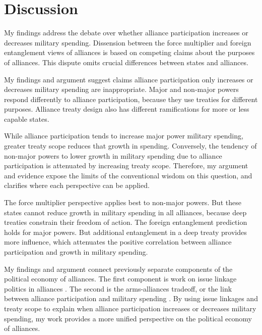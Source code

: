 \documentclass[12pt]{article}
\begin{document}
\section{Discussion}


My findings address the debate over whether alliance participation increases or decreases military spending. 
Dissension between the force multiplier and foreign entanglement views of alliances is based on competing claims about the purposes of alliances. 
This dispute omits crucial differences between states and alliances. 


My findings and argument suggest claims alliance participation only increases or decreases military spending are inappropriate. 
Major and non-major powers respond differently to alliance participation, because they use treaties for different purposes. 
Alliance treaty design also has different ramifications for more or less capable states. 


While alliance participation tends to increase major power military spending, greater treaty scope reduces that growth in spending. 
Conversely, the tendency of non-major powers to lower growth in military spending due to alliance participation is attenuated by increasing treaty scope. 
Therefore, my argument and evidence expose the limits of the conventional wisdom on this question, and clarifies where each perspective can be applied. 


The force multiplier perspective applies best to non-major powers. 
But these states cannot reduce growth in military spending in all alliances, because deep treaties constrain their freedom of action.
The foreign entanglement prediction holds for major powers. 
But additional entanglement in a deep treaty provides more influence, which attenuates the positive correlation between alliance participation and growth in military spending. 


My findings and argument connect previously separate components of the political economy of alliances. 
The first component is work on issue linkage politics in alliances \citep{Poast2012, Poast2013, Johnson2015}.
The second is the arms-alliances tradeoff, or the link between alliance participation and military spending \citep{Morrow1993}. 
By using issue linkages and treaty scope to explain when alliance participation increases or decreases military spending, my work provides a more unified perspective on the political economy of alliances.  
\end{document}

